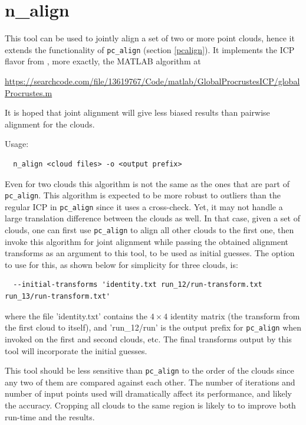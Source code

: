 \section{n\_align}
\label{nalign}

This tool can be used to jointly align a set of two or more point clouds, hence it extends
the functionality of \texttt{pc\_align} (section \ref{pcalign}). It implements the 
ICP flavor from \cite{toldo2010global}, more exactly, 
the MATLAB algorithm at
\begin{center}
\url{https://searchcode.com/file/13619767/Code/matlab/GlobalProcrustesICP/globalProcrustes.m}
\end{center}

It is hoped that joint alignment will give
less biased results than pairwise alignment for the clouds.  

\medskip
Usage:
\begin{verbatim}
  n_align <cloud files> -o <output prefix>
\end{verbatim}

Even for two clouds this algorithm is not the same as the ones that are
part of \texttt{pc\_align}. This algorithm is expected to be more
robust to outliers than the regular ICP in \texttt{pc\_align} since it
uses a cross-check. Yet, it may not handle a large translation
difference between the clouds as well. In that case, given a set of
clouds, one can first use \texttt{pc\_align} to align all other clouds
to the first one, then invoke this algorithm for joint alignment while
passing the obtained alignment transforms as an argument to this tool,
to be used as initial guesses. The option to use for this, as shown
below for simplicity for three clouds, is:

\begin{verbatim}
  --initial-transforms 'identity.txt run_12/run-transform.txt run_13/run-transform.txt'
\end{verbatim}

where the file 'identity.txt' contains the $4 \times 4$ identity matrix (the transform 
from the first cloud to itself), and 'run\_12/run' is the output prefix for \texttt{pc\_align}
when invoked on the first and second clouds, etc. The final transforms output by this tool
will incorporate the initial guesses.  

This tool should be less sensitive than \texttt{pc\_align} to the order of the clouds 
since any two of them are compared against each other. The number of iterations and number
of input points used will dramatically affect its performance, and likely the accuracy. 
Cropping all clouds to the same region is likely to to improve both run-time and the results. 
 

